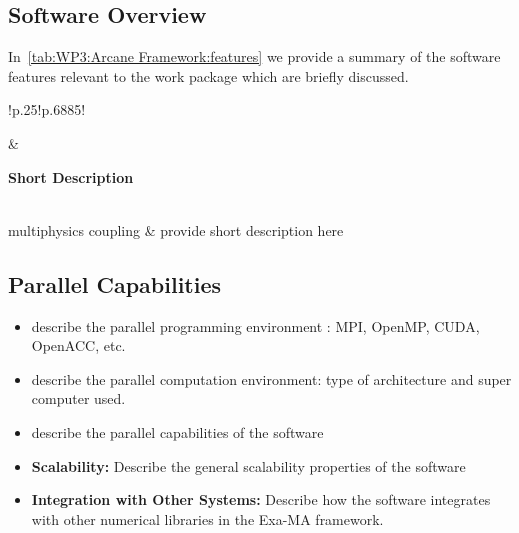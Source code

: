 \subsection{Software Overview}
\label{sec:WP3:Arcane Framework:summary}

In~\cref{tab:WP3:Arcane Framework:features} we provide a summary of the software features relevant to the work package which are briefly discussed.

\begin{table}[h!]
    \centering
    { 
        \setlength{\parindent}{0pt}
        \def\arraystretch{1.25}
        {
            \fontsize{9}{11}\selectfont
            \begin{tabular}{!{\color{numpexgray}\vrule}p{.25\linewidth}!{\color{numpexgray}\vrule}p{.6885\linewidth}!{\color{numpexgray}\vrule}}
    
     &  {\rule{0pt}{2.5ex}\color{white}\bf Short Description }\\ 
    
    multiphysics coupling & provide short description here \\
\end{tabular}
        }
    }
    \caption{WP3: Arcane Framework Features}
    \label{tab:WP3:Arcane Framework:features}
\end{table}


\subsection{Parallel Capabilities}
\label{sec:WP3:Arcane Framework:performances}


\begin{itemize}
    \item describe the parallel programming  environment : MPI, OpenMP, CUDA, OpenACC, etc.
    \item describe the parallel computation environment: type of architecture and super computer used.
    \item describe the parallel capabilities of the software
    \item \textbf{Scalability:} Describe the general scalability properties of the software
    \item \textbf{Integration with Other Systems:} Describe how the software integrates with other numerical libraries in the Exa-MA framework.
\end{itemize}



